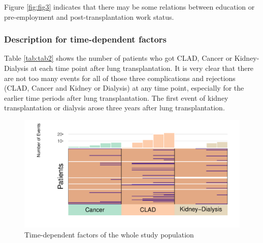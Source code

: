 \documentclass[11pt, a4paper]{article}\usepackage[]{graphicx}\usepackage[]{color}
\makeatletter
\def\maxwidth{ %
  \ifdim\Gin@nat@width>\linewidth
    \linewidth
  \else
    \Gin@nat@width
  \fi
}
\newenvironment{knitrout}{}{} %
\makeatother
\begin{document}
Figure \ref{fig:fig3} indicates that there may be some relations between education or pre-employment and post-transplantation work status. 



\subsubsection*{Description for time-dependent factors}\label{subsubsec:time_dep}
\begin{table}[ht]
\centering
\caption{Number of events with respect to time-dependent factors} 
\label{tab:tab2}
\end{table}






Table \ref{tab:tab2} shows the number of patients who got CLAD, Cancer or Kidney-Dialysis at each time point after lung transplantation. It is very clear that there are not too many events for all of those three complications and rejections (CLAD, Cancer and Kidney or Dialysis) at any time point, especially  for the earlier time periods after lung transplantation. The first event of kidney transplantation or dialysis arose three years after lung transplantation.



\begin{figure}[!ht]
\begin{knitrout}
\color{fgcolor}
\includegraphics[width=\maxwidth]{plots/ptimedep_heatmap-1} 

\end{knitrout}
\caption{Time-dependent factors of the whole study population} \label{fig:fig5}
\end{figure}
\end{document}
